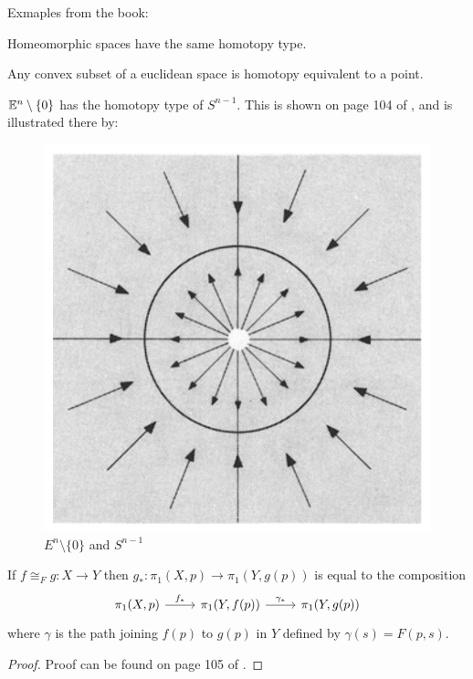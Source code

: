 Exmaples from the book:
\begin{ex}
    Homeomorphic spaces have the same homotopy type.
\end{ex}
\begin{ex}
    Any convex subset of a euclidean space is homotopy equivalent to a
    point.
\end{ex}
\begin{ex}
    \label{ex:Euclidean-space-and-sphere-homotopy}
    $\mathbb{E}^n\setminus \{0\}$ has the homotopy type of $S^{n-1}$. This is
    shown on page 104 of \cite{book}, and is illustrated there by:
    \begin{figure}[H]
        \centering
        \includegraphics[width=0.6\linewidth]{pics/En-0-and-S-n-1.PNG}
        \caption{$E^n\setminus\{0\}$ and $S^{n-1}$}
    \end{figure}
\end{ex}

\begin{thm}
    If $f\cong_F g:X\to Y$ then $g_*:\pi_1(X,p)\to \pi_1(Y,g(p))$ is
    equal to the composition
    \begin{equation} \begin{tikzcd}[]
        \pi_1(X,p)\ar[r,"f_*"]&\pi_1(Y,f(p))\ar[r,"\gamma_*"]
            &\pi_1(Y,g(p))
    \end{tikzcd} \end{equation}
    where $\gamma$ is the path joining $f(p)$ to $g(p)$ in $Y$ defined
    by $\gamma(s)=F(p,s)$.
\end{thm}
\begin{proof}
    Proof can be found on page 105 of \cite{book}.
\end{proof}

